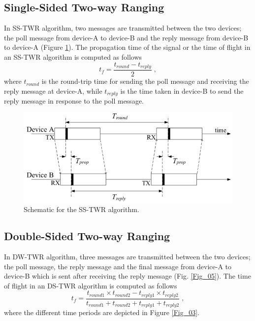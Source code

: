 \documentclass{article}
\begin{document}
\subsection{Single-Sided Two-way Ranging}
In SS-TWR algorithm, two messages are transmitted between the two devices; the poll message from device-A to device-B and the reply message from device-B to device-A (Figure \ref{Fig_02}).
The propagation time of the signal or the time of flight in an SS-TWR algorithm is computed as follows
\begin{equation} \label{Eq_01_02}
t_f = \frac{t_{round} - t_{reply}}{2} \;,
\end{equation}
where $t_{round}$ is the round-trip time for sending the poll message and receiving the reply message at device-A, while $t_{reply}$ is the time taken in device-B to send the reply message in response to the poll message.

\begin{figure}[thpb]
\centering
\includegraphics[scale=0.6]{Pics/SS_TWR.PNG}
\caption{Schematic for the SS-TWR algorithm.}
\label{Fig_02}
\end{figure}

\subsection{Double-Sided Two-way Ranging}
In DW-TWR algorithm, three messages are transmitted between the two devices; the poll message, the reply message and the final message from device-A to device-B which is sent after receiving the reply message (Fig. \ref{Fig_05}).
The time of flight in an DS-TWR algorithm is computed as follows
\begin{equation} \label{Eq_01_03}
t_f = \frac{t_{round1} \times t_{round2} - t_{reply1} \times t_{reply2}}{t_{round1} + t_{round2} + t_{reply1} + t_{reply2}} \;,
\end{equation}
where the different time periods are depicted in Figure \ref{Fig_03}.
\end{document}
